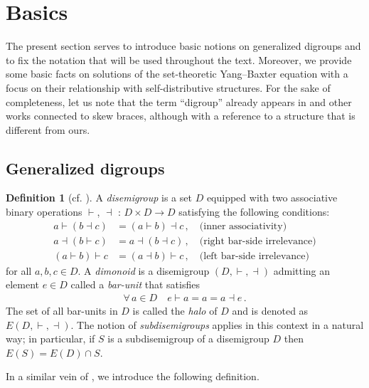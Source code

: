 \documentclass[preprint,1p]{elsarticle}
\numberwithin{equation}{section}
\theoremstyle{definition}               %
\newtheorem{defin}[theor]{Definition}
\newcommand{\vd}{\vdash}
\newcommand{\dv}{\dashv}
\begin{document}
\smallskip

\section{Basics}\label{Sec1}
The present section serves to introduce basic notions on generalized digroups and to fix the notation that will be used throughout the text.
Moreover, we provide some basic facts on solutions of the set-theoretic Yang--Baxter equation with a focus on their relationship with self-distributive structures.
For the sake of completeness, let us note that the term ``digroup'' already appears in \cite{BoFaPo23} and other works connected to skew braces, although with a reference to a structure that is different from ours.

\smallskip

\subsection{Generalized digroups}

\begin{defin}[cf. \cite{Lod01}]\label{def:digroups}
    A \emph{disemigroup} is a set $D$ equipped with two associative binary operations $\vd$, $\dv$ : $D \times D \to D$ satisfying the following conditions:
    \begin{align}
        a \vd (b \dv c) &= (a \vd b) \dv c \,,\quad \text{(inner associativity)} \label{inn_assoc} \\
        a \dv (b \vd c) &= a \dv (b \dv c) \,,\quad \text{(right bar-side irrelevance)} \label{rbarside} \\
        (a \vd b) \vd c&= (a \dv b) \vd c \,,\quad \text{(left bar-side irrelevance)} \label{lbarside}
    \end{align}
    for all $a,b,c \in D$.
    A \emph{dimonoid} is a disemigroup $(D,\vd,\dv)$ admitting an element $e \in D$ called a \emph{bar-unit} that satisfies
    \begin{align}
        \forall\,a \in D \quad e \vd a = a = a \dv e \,.\label{bar-unit}
    \end{align}
    The set of all bar-units in $D$ is called the \emph{halo} of $D$ and is denoted as ${E(D,\vd,\dv)}$.
    The notion of \emph{subdisemigroups} applies in this context in a natural way; in particular, if $S$ is a subdisemigroup of a disemigroup $D$ then $E(S) = E(D) \cap S$.
\end{defin}

In a similar vein of \cite{Smith22}, we introduce the following definition.
\end{document}
